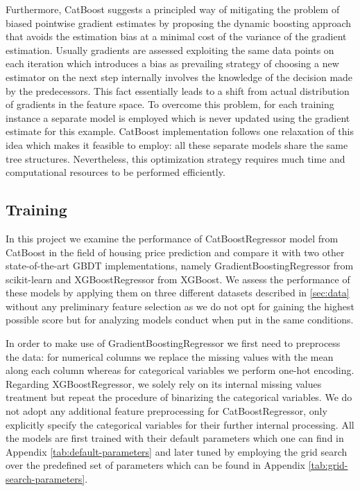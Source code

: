 Furthermore, CatBoost suggests a principled way of mitigating the problem of biased pointwise gradient estimates by proposing the dynamic boosting approach that avoids the estimation bias at a minimal cost of the variance of the gradient estimation. Usually gradients are assessed exploiting the same data points on each iteration which introduces a bias as prevailing strategy of choosing a new estimator on the next step internally involves the knowledge of the decision made by the predecessors. This fact essentially leads to a shift from actual distribution of gradients in the feature space. To overcome this problem, for each training instance a separate model is employed which is never updated using the gradient estimate for this example. CatBoost implementation follows one relaxation of this idea which makes it feasible to employ: all these separate models share the same tree structures. Nevertheless, this optimization strategy requires much time and computational resources to be performed efficiently.

\subsection{Training}

In this project we examine the performance of CatBoostRegressor model from CatBoost in the field of housing price prediction and compare it with two other state-of-the-art GBDT implementations, namely GradientBoostingRegressor from scikit-learn and XGBoostRegressor from XGBoost. We assess the performance of these models  by applying them on three different datasets described in \cref{sec:data} without any preliminary feature selection as we do not opt for gaining the highest possible score but for analyzing models conduct when put in the same conditions.

In order to make use of GradientBoostingRegressor we first need to preprocess the data: for numerical columns we replace the missing values with the mean along each column whereas for categorical variables we perform one-hot encoding. Regarding XGBoostRegressor, we solely rely on its internal missing values treatment but repeat the procedure of binarizing the categorical variables. We do not adopt any additional feature preprocessing for CatBoostRegressor, only explicitly specify the categorical variables for their further internal processing. All the models are first trained with their default parameters which one can find in Appendix \cref{tab:default-parameters} and later tuned by employing the grid search over the predefined set of parameters which can be found in Appendix \cref{tab:grid-search-parameters}.

